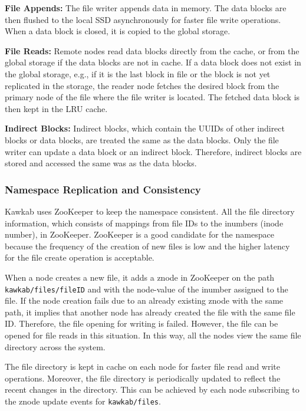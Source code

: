 \documentclass[]{article}
\newcommand{\subtopic}[1]{\vspace{1.5pt} \noindent \textbf{#1}}
\begin{document}
\subtopic{File Appends:} The file writer appends data in memory. The data
blocks are then flushed to the local SSD asynchronously for faster file write
operations. When a data block is closed, it is copied to the global storage.

\subtopic{File Reads:} Remote nodes read data blocks directly from the cache,
or from the global storage if the data blocks are not in cache.  If a
data block does not exist in the global storage, e.g., if it is the last block
in file or the block is not yet replicated in the storage, the reader
node fetches the desired block from the primary node of the file where the file
writer is located. The fetched data block is then kept in the LRU cache.

\subtopic{Indirect Blocks:} Indirect blocks, which contain the UUIDs of other
indirect blocks or data blocks, are treated the same as the data blocks.
Only the file writer can update a data block or an indirect block. Therefore,
indirect blocks are stored and accessed the same was as the data blocks.


\subsubsection{Namespace Replication and Consistency}
Kawkab uses ZooKeeper to keep the namespace consistent. All the file
directory information, which consists of mappings from file IDs to the
inumbers (inode number), in ZooKeeper. ZooKeeper is a good candidate
for the namespace because the frequency of the creation of new files is low
and the higher latency for the file create operation is acceptable.

When a node creates a new file, it adds a znode in ZooKeeper on the path
\texttt{kawkab/files/fileID} and with the node-value of the inumber assigned to
the file. If the node creation fails due to an already existing znode with
the same path, it implies that another node has already created the file with the same
file ID. Therefore, the file opening for writing is failed. However, the file can be
opened for file reads in this situation. In this way, all the nodes view
the same file directory across the system.

The file directory is kept in cache on each node for faster file read and write
operations. Moreover, the file directory is periodically updated to reflect the
recent changes in the directory. This can be achieved by each node subscribing
to the znode update events for \texttt{kawkab/files}.
\end{document}
